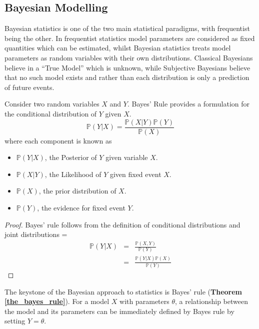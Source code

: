 \documentclass[11pt,a4paper]{article}
\newcommand*{\prob}{\mathbb{P}}
\theoremstyle{break}
\begin{document}
\subsection{Bayesian Modelling}

  \par Bayesian statistics is one of the two main statistical paradigms, with frequentist being the other. In frequentist statistics model parameters are considered as fixed quantities which can be estimated, whilst Bayesian statistics treats model parameters as random variables with their own distributions. Classical Bayesians believe in a ``True Model'' which is unknown, while Subjective Bayesians believe that no such model exists and rather than each distribution is only a prediction of future events.

  \begin{box_theorem}\label{the_bayes_rule}
    Consider two random variables $X$ and $Y$. Bayes' Rule provides a formulation for the conditional distribution of $Y$ given $X$.
    \[ \prob(Y|X)=\frac{\prob(X|Y)\prob(Y)}{\prob(X)} \]
    where each component is known as
    \begin{itemize}
      \item $\prob(Y|X)$, the Posterior of $Y$ given variable $X$.
      \item $\prob(X|Y)$, the Likelihood of $Y$ given fixed event $X$.
      \item $\prob(X)$, the prior distribution of $X$.
      \item $\prob(Y)$, the evidence for fixed event $Y$.
    \end{itemize}
    \begin{proof}
      Bayes' rule follows from the definition of conditional distributions and joint distributions
      \everymath={\displaystyle}
      \[\begin{array}{rcl}
        \prob(Y|X)&=&\frac{\prob(X,Y)}{\prob(Y)}\\
        &=&\frac{\prob(Y|X)\prob(X)}{\prob(Y)}
      \end{array}\]
    \end{proof}
  \end{box_theorem}

  \par The keystone of the Bayesian approach to statistics is Bayes' rule (\textbf{Theorem \ref{the_bayes_rule}}). For a model $X$ with parameters $\theta$, a relationship between the model and its parameters can be immediately defined by Bayes rule by setting $Y=\theta$.
\end{document}
